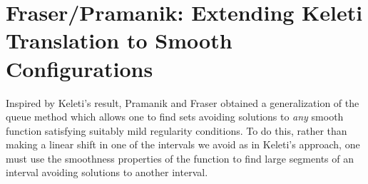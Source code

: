 \documentclass{report}
\theoremstyle{plain}
\theoremstyle{plain}
\newtheorem*{remark}{Remark}
\begin{document}







\section{Fraser/Pramanik: Extending Keleti Translation to Smooth Configurations}

Inspired by Keleti's result, Pramanik and Fraser obtained a generalization of the queue method which allows one to find sets avoiding solutions to {\it any} smooth function satisfying suitably mild regularity conditions. To do this, rather than making a linear shift in one of the intervals we avoid as in Keleti's approach, one must use the smoothness properties of the function to find large segments of an interval avoiding solutions to another interval.
\end{document}
